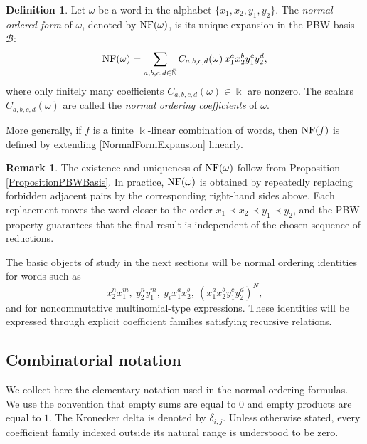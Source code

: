 \documentclass{amsart}
\theoremstyle{definition}
\newtheorem{definition}[theorem]{Definition}
\newtheorem{remark}[theorem]{Remark}
\theoremstyle{remark}
\numberwithin{equation}{section}
\begin{document}
\begin{definition}\label{DefinitionNormalForm}
Let $\omega$ be a word in the alphabet $\{x_1,x_2,y_1,y_2\}$. The \emph{normal ordered form} of $\omega$, denoted by ${\rm NF}(\omega)$, is its unique expansion in the PBW basis $\mathcal{B}$:
\begin{equation}\label{NormalFormExpansion}
{\rm NF}(\omega)
=
\sum_{a,b,c,d\in\bar{\mathbb{N}}}
C_{a,b,c,d}(\omega)\,
x_1^ax_2^by_1^cy_2^d,
\end{equation}
where only finitely many coefficients $C_{a,b,c,d}(\omega)\in\Bbbk$ are nonzero. The scalars $C_{a,b,c,d}(\omega)$ are called the \emph{normal ordering coefficients} of $\omega$.
\end{definition}

More generally, if $f$ is a finite $\Bbbk$-linear combination of words, then ${\rm NF}(f)$ is defined by extending \eqref{NormalFormExpansion} linearly.

\begin{remark}\label{RemarkNormalOrdering}
The existence and uniqueness of ${\rm NF}(\omega)$ follow from Proposition \ref{PropositionPBWBasis}. In practice, ${\rm NF}(\omega)$ is obtained by repeatedly replacing forbidden adjacent pairs by the corresponding right-hand sides above. Each replacement moves the word closer to the order $x_1\prec x_2\prec y_1\prec y_2$, and the PBW property guarantees that the final result is independent of the chosen sequence of reductions.
\end{remark}

The basic objects of study in the next sections will be normal ordering identities for words such as
\[
x_2^nx_1^m,\ y_2^ny_1^m,\ y_ix_1^ax_2^b,
\
\left(x_1^ax_2^by_1^cy_2^d\right)^N,
\]
and for noncommutative multinomial-type expressions. These identities will be expressed through explicit coefficient families satisfying recursive relations.


\subsection{Combinatorial notation}\label{SubsectionCombinatorialNotation}

We collect here the elementary notation used in the normal ordering formulas. We use the convention that empty sums are equal to $0$ and empty products are equal to $1$. The Kronecker delta is denoted by $\delta_{i,j}$. Unless otherwise stated, every coefficient family indexed outside its natural range is understood to be zero.
\end{document}
